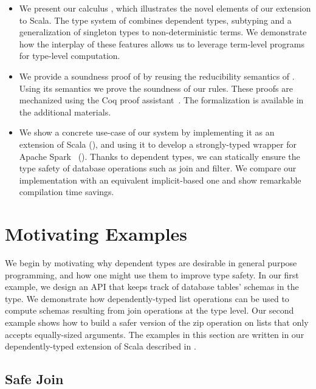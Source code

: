 \begin{itemize}
\item
  We present our calculus \oursystem, which illustrates the novel elements of our extension to Scala.
  The type system of \oursystem combines dependent types, subtyping and a generalization of singleton types to non-deterministic terms.
  We demonstrate how the interplay of these features allows us to leverage term-level programs for type-level computation.
\item
  We provide a soundness proof of \oursystem by reusing the reducibility semantics of \FR \citep{hamza2019system}.
  Using its semantics we prove the soundness of our rules.
  These proofs are mechanized using the Coq proof assistant~\citep{bertot2004interactive}.
  The formalization is available in the additional materials.
\item
  We show a concrete use-case of our system by implementing it as an extension of Scala (), and using it to develop a strongly-typed wrapper for Apache Spark~\citep{zaharia2016apache} ().
  Thanks to dependent types, we can statically ensure the type safety of database operations such as join and filter.
  We compare our implementation with an equivalent implicit-based one and show remarkable compilation time savings.
\end{itemize}

\section{Motivating Examples}
\label{sec:motivating-example}

We begin by motivating why dependent types are desirable in general purpose programming, and how one might use them to improve type safety.
In our first example, we design an API that keeps track of database tables' schemas in the type.
We demonstrate how dependently-typed list operations can be used to compute schemas resulting from join operations at the type level.
Our second example shows how to build a safer version of the zip operation on lists that only accepts equally-sized arguments.
The examples in this section are written in our dependently-typed extension of Scala described in .

\subsection{Safe Join}
\label{sec:safe-join}

